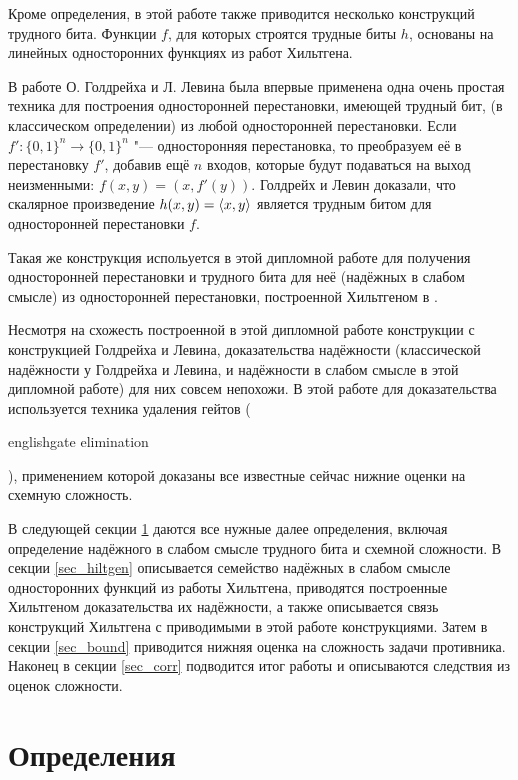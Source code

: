 \documentclass[a4paper, 14pt]{extarticle}
\begin{document}
Кроме определения, в этой работе также приводится несколько конструкций трудного
бита. Функции $f$, для которых строятся трудные биты $h$, основаны на линейных
односторонних функциях из работ Хильтгена.

В работе О. Голдрейха и Л. Левина \cite{goldreich_levin} была впервые применена
одна очень простая техника для построения односторонней перестановки, имеющей
трудный бит, (в классическом определении) из любой односторонней перестановки.
Если $f' : \{0, 1\}^n \to \{0, 1\}^n$ "--- односторонняя перестановка, то
преобразуем её в перестановку $f'$, добавив ещё $n$ входов, которые будут
подаваться на выход неизменными: $f(x, y) = (x, f'(y))$. Голдрейх и Левин
доказали, что скалярное произведение $h(x, y) = \langle x, y\rangle$ является трудным
битом для односторонней перестановки $f$.

Такая же конструкция испольуется в этой дипломной работе для получения
односторонней перестановки и трудного бита для неё (надёжных в слабом смысле) из
односторонней перестановки, построенной Хильтгеном в \cite{hiltgen1993}.

Несмотря на схожесть построенной в этой дипломной работе конструкции с
конструкцией Голдрейха и Левина, доказательства надёжности (классической
надёжности у Голдрейха и Левина, и надёжности в слабом смысле в этой
дипломной работе) для них совсем непохожи. В этой работе для доказательства
используется техника удаления гейтов (\begin{foreignlanguage}{english}gate
elimination\end{foreignlanguage}), применением которой доказаны все известные
сейчас нижние оценки на схемную сложность.

В следующей секции \ref{sec_defs} даются все нужные далее определения, включая
определение надёжного в слабом смысле трудного бита и схемной сложности.
В секции \ref{sec_hiltgen} описывается семейство надёжных в слабом смысле
односторонних функций из работы Хильтгена, приводятся построенные Хильтгеном
доказательства их надёжности, а также описывается связь конструкций Хильтгена
с приводимыми в этой работе конструкциями. Затем в секции \ref{sec_bound}
приводится нижняя оценка на сложность задачи противника. Наконец в секции
\ref{sec_corr} подводится итог работы и описываются следствия из оценок
сложности.

\section{Определения}
\label{sec_defs}
\end{document}
